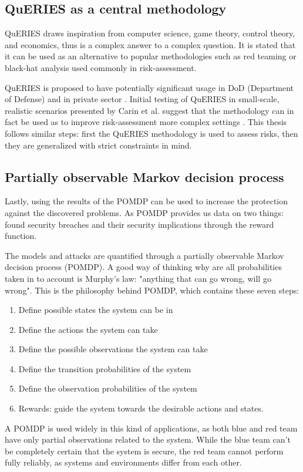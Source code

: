 \subsection{QuERIES as a central methodology}

QuERIES draws inspiration from computer science, game theory, control theory, and economics, thus is a complex answer to a complex question. It is stated that it can be used as an alternative to popular methodologies such as red teaming or black-hat analysis used commonly in risk-assessment. \cite{carin2008cybersecurity}

QuERIES is proposed to have potentially significant usage in DoD (Department of Defense) and in private sector \cite{carin2008cybersecurity}. Initial testing of QuERIES in small-scale, realistic scenarios presented by Carin et al. suggest that the methodology can in fact be used as to improve risk-assessment more complex settings \cite{carin2008cybersecurity}. This thesis follows similar steps: first the QuERIES methodology is used to assess risks, then they are generalized with strict constraints in mind. 

\subsection{Partially observable Markov decision process}

Lastly, using the results of the POMDP can be used to increase the protection against the discovered problems. As POMDP provides us data on two things: found security breaches and their security implications through the reward function. 


The models and attacks are quantified through a partially observable Markov decision process (POMDP). A good way of thinking why are all probabilities taken in to account is Murphy's law: "anything that can go wrong, will go wrong". This is the philosophy behind POMDP, which contains these seven steps:
\begin{enumerate}
    \item Define possible states the system can be in
    \item Define the actions the system can take
    \item Define the possible observations the system can take
    \item Define the transition probabilities of the system
    \item Define the observation probabilities of the system
    \item Rewards: guide the system towards the desirable actions and states.
\end{enumerate} \cite{hughes2013quantitative}

A POMDP is used widely in this kind of applications, as both blue and red team have only partial observations related to the system. While the blue team can't be completely certain that the system is secure, the red team cannot perform fully reliably, as systems and environments differ from each other. \cite{mcabeeMarkov}